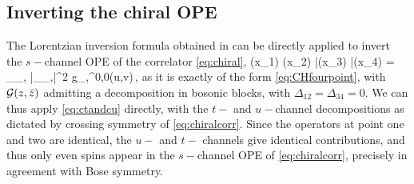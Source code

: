 \subsection{Inverting the chiral OPE}
\label{sec:chiral_inv}

The Lorentzian inversion formula obtained in \cite{Caron-Huot:2017vep} can be directly applied to invert the $s-$channel OPE of the correlator \eqref{eq:chiral},
\be 
\langle \phi(x_1) \phi(x_2) \bar{\phi}(x_3) \bar{\phi}(x_4) \rangle =  \sum\limits_{\OO_{\Delta,\ell}} |\lambda_{\phi \phi \OO_{\Delta,\ell}}|^2 g_{\Delta,\ell}^{0,0}(u,v)\,,
\label{eq:chiralcorr}
\ee 
as it is exactly of the form \eqref{eq:CHfourpoint}, with ${\mathcal{G}}(z,{\bar{z}})$ admitting a decomposition in bosonic blocks, with $\Delta_{12}=\Delta_{34}=0$. We can thus apply \eqref{eq:ctandcu} directly, with the $t-$ and $u-$channel decompositions as dictated by crossing symmetry of \eqref{eq:chiralcorr}. Since the operators at point one and two are identical, the $u-$ and $t-$ channels give identical contributions, and thus only even spins appear in the $s-$channel OPE of \eqref{eq:chiralcorr}, precisely in agreement with Bose symmetry.


